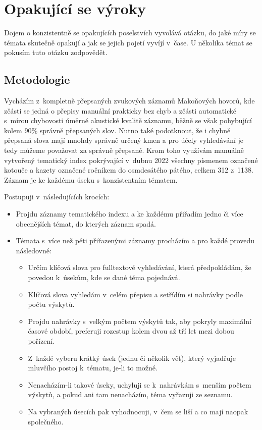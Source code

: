 \section{Opakující se výroky}

Dojem o konzistentně se opakujících poselstvích vyvolává otázku, do jaké míry se
témata skutečně opakují a jak se jejich pojetí vyvíjí v~čase. U několika témat
se pokusím tuto otázku zodpovědět.

\subsection{Metodologie}

Vycházím z~kompletně přepsaných zvukových záznamů Makoňových hovorů, kde zčásti
se jedná o přepisy manuální prakticky bez chyb a zčásti automatické s~mírou
chybovosti úměrné akustické kvalitě záznamu, běžně se však pohybující kolem 90\%
správně přepsaných slov. Nutno také podotknout, že i chybně přepsaná slova mají
mnohdy správně určený kmen a pro účely vyhledávání je tedy můžeme považovat za
správně přepsané. Krom toho využívám manuálně vytvořený tematický index
pokrývající v~dubnu 2022 všechny písmenem označené kotouče a kazety označené
ročníkem do osmdesátého pátého, celkem 312 z~1138. Záznam je ke každému úseku
s~konzistentním tématem.

Postupuji v~následujících krocích:
\begin{itemize}
\item{
Projdu záznamy tematického indexu a ke každému přiřadím jedno či více
obecnějších témat, do kterých záznam spadá.
}
\item{
Témata s~více než pěti přiřazenými záznamy procházím a pro každé provedu
následovné:
\begin{itemize}
\item{
Určím klíčová slova pro fulltextové vyhledávání, která předpokládám, že povedou
k~úsekům, kde se dané téma pojednává.
}
\item{
Klíčová slova vyhledám v~celém přepisu a setřídím si nahrávky podle počtu
výskytů.
}
\item{
Projdu nahrávky s~velkým počtem výskytů tak, aby pokryly maximální časové
období, preferuji rozestup kolem dvou až tří let mezi dobou pořízení.
}
\item{
Z~každé vyberu krátký úsek (jednu či několik vět), který vyjadřuje mluvčího
postoj k~tématu, je-li to možné.
}
\item{
Nenacházím-li takové úseky, uchyluji se k~nahrávkám s~menším počtem výskytů, a
pokud ani tam nenacházím, téma vyřazuji ze seznamu.
}
\item{
Na vybraných úsecích pak vyhodnocuji, v~čem se liší a co mají naopak
společného.
}
\end{itemize}
}
\end{itemize}

